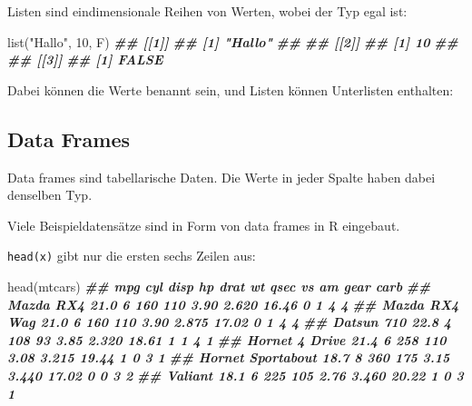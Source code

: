 \documentclass[
  ngerman,
]{article}
\newenvironment{Shaded}{\begin{snugshade}}{\end{snugshade}}
\newcommand{\AttributeTok}[1]{\textcolor[rgb]{0.77,0.63,0.00}{#1}}
\newcommand{\ConstantTok}[1]{\textcolor[rgb]{0.00,0.00,0.00}{#1}}
\newcommand{\DecValTok}[1]{\textcolor[rgb]{0.00,0.00,0.81}{#1}}
\newcommand{\DocumentationTok}[1]{\textcolor[rgb]{0.56,0.35,0.01}{\textbf{\textit{#1}}}}
\newcommand{\FunctionTok}[1]{\textcolor[rgb]{0.00,0.00,0.00}{#1}}
\newcommand{\NormalTok}[1]{#1}
\newcommand{\OtherTok}[1]{\textcolor[rgb]{0.56,0.35,0.01}{#1}}
\newcommand{\StringTok}[1]{\textcolor[rgb]{0.31,0.60,0.02}{#1}}
\begin{document}
Listen sind eindimensionale Reihen von Werten, wobei der Typ egal ist:

\begin{Shaded}
\begin{Highlighting}[]
\FunctionTok{list}\NormalTok{(}\StringTok{"Hallo"}\NormalTok{, }\DecValTok{10}\NormalTok{, F)}
\DocumentationTok{\#\# [[1]]}
\DocumentationTok{\#\# [1] "Hallo"}
\DocumentationTok{\#\# }
\DocumentationTok{\#\# [[2]]}
\DocumentationTok{\#\# [1] 10}
\DocumentationTok{\#\# }
\DocumentationTok{\#\# [[3]]}
\DocumentationTok{\#\# [1] FALSE}
\end{Highlighting}
\end{Shaded}

Dabei können die Werte benannt sein, und Listen können Unterlisten enthalten:

\begin{Shaded}
\end{Shaded}

\hypertarget{data-frames}{%
\subsection{Data Frames}\label{data-frames}}

Data frames sind tabellarische Daten. Die Werte in jeder Spalte haben dabei denselben Typ.

Viele Beispieldatensätze sind in Form von data frames in R eingebaut.

\texttt{head(x)} gibt nur die ersten sechs Zeilen aus:

\begin{Shaded}
\begin{Highlighting}[]
\FunctionTok{head}\NormalTok{(mtcars)}
\DocumentationTok{\#\#                    mpg cyl disp  hp drat    wt  qsec vs am gear carb}
\DocumentationTok{\#\# Mazda RX4         21.0   6  160 110 3.90 2.620 16.46  0  1    4    4}
\DocumentationTok{\#\# Mazda RX4 Wag     21.0   6  160 110 3.90 2.875 17.02  0  1    4    4}
\DocumentationTok{\#\# Datsun 710        22.8   4  108  93 3.85 2.320 18.61  1  1    4    1}
\DocumentationTok{\#\# Hornet 4 Drive    21.4   6  258 110 3.08 3.215 19.44  1  0    3    1}
\DocumentationTok{\#\# Hornet Sportabout 18.7   8  360 175 3.15 3.440 17.02  0  0    3    2}
\DocumentationTok{\#\# Valiant           18.1   6  225 105 2.76 3.460 20.22  1  0    3    1}
\end{Highlighting}
\end{Shaded}
\end{document}
